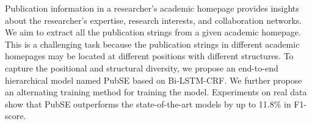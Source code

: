 Publication information in a researcher's academic homepage provides insights about the researcher's expertise, research interests, and collaboration networks. We aim to extract all the publication strings from a given academic homepage. This is a challenging task because the publication strings in different academic homepages may be located at different positions with different structures. To capture the positional and structural diversity, we propose an end-to-end hierarchical model named PubSE based on Bi-LSTM-CRF. We further propose an alternating training method for training the model. Experiments on real data show that PubSE outperforms the state-of-the-art models by up to 11.8\% in F1-score.
